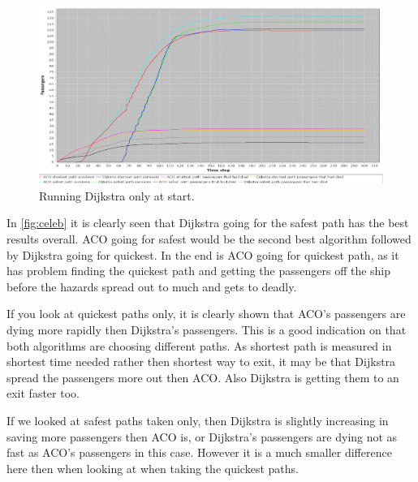 \begin{figure} [h]
\centering
\hspace*{-1.0in}
\includegraphics[scale=0.35]{images/Graph-using-1000-rounds-140-passangers-and-one-fire-dijkstra-one-time.png}
\caption{Running Dijkstra only at start.}
\label{fig:celebDF}
\end{figure}


In \ref{fig:celeb} it is clearly seen that Dijkstra going for the safest path has the best results overall. ACO going for safest would be the second best algorithm followed by Dijkstra going for quickest. In the end is ACO going for quickest path, as it has problem finding the quickest path and getting the passengers off the ship before the hazards spread out to much and gets to deadly.

If you look at quickest paths only, it is clearly shown that ACO's passengers are dying more rapidly then Dijkstra's passengers. This is a good indication on that both algorithms are choosing different paths. As shortest path is measured in shortest time needed rather then shortest way to exit, it may be that Dijkstra spread the passengers more out then ACO. Also Dijkstra is getting them to an exit faster too.

If we looked at safest paths taken only, then Dijkstra is slightly increasing in saving more passengers then ACO is, or Dijkstra's passengers are dying not as fast as ACO's passengers in this case. However it is a much smaller difference here then when looking at when taking the quickest paths.



